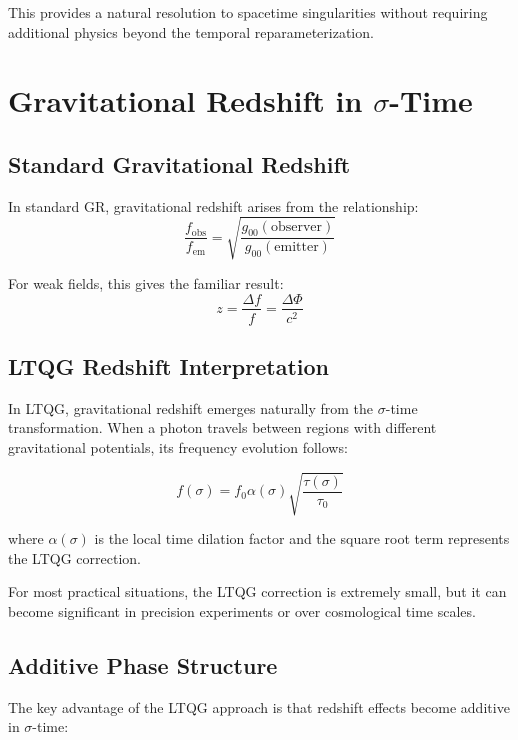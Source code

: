 \documentclass[12pt,a4paper]{article}
\begin{document}
This provides a natural resolution to spacetime singularities without requiring additional physics beyond the temporal reparameterization.

\section{Gravitational Redshift in $\sigma$-Time}

\subsection{Standard Gravitational Redshift}

In standard GR, gravitational redshift arises from the relationship:
\begin{equation}
\frac{f_{\text{obs}}}{f_{\text{em}}} = \sqrt{\frac{g_{00}(\text{observer})}{g_{00}(\text{emitter})}}
\end{equation}

For weak fields, this gives the familiar result:
\begin{equation}
z = \frac{\Delta f}{f} = \frac{\Delta \Phi}{c^2}
\end{equation}

\subsection{LTQG Redshift Interpretation}

In LTQG, gravitational redshift emerges naturally from the $\sigma$-time transformation. When a photon travels between regions with different gravitational potentials, its frequency evolution follows:

\begin{equation}
f(\sigma) = f_0 \alpha(\sigma) \sqrt{\frac{\tau(\sigma)}{\tau_0}}
\end{equation}

where $\alpha(\sigma)$ is the local time dilation factor and the square root term represents the LTQG correction.

For most practical situations, the LTQG correction is extremely small, but it can become significant in precision experiments or over cosmological time scales.

\subsection{Additive Phase Structure}

The key advantage of the LTQG approach is that redshift effects become additive in $\sigma$-time:
\end{document}
